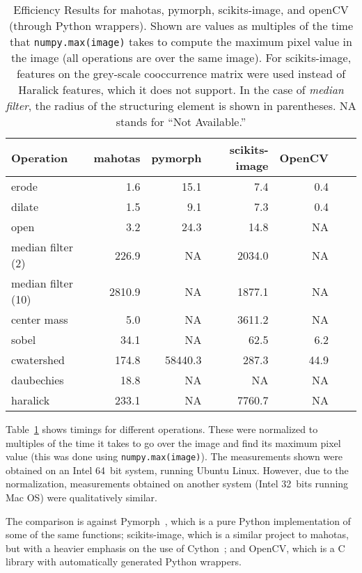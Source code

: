 \documentclass{scrartcl}
\newcommand*{\cpp}{{C\nolinebreak[4]\hspace{-.05em}\raisebox{.4ex}{\tiny\textbf{++}}}}
\let\code\texttt
\begin{document}
\begin{table}
\centering
\begin{tabular}{lrrrrrr}
\toprule
Operation            &  mahotas &  pymorph & scikits-image & OpenCV \\
\midrule
erode                &      1.6 &     15.1 &      7.4 &      0.4  \\
dilate               &      1.5 &      9.1 &      7.3 &      0.4  \\
open                 &      3.2 &     24.3 &     14.8 &       NA  \\
median filter (2)    &    226.9 &       NA &   2034.0 &       NA  \\
median filter (10)   &   2810.9 &       NA &   1877.1 &       NA  \\
center mass          &      5.0 &       NA &   3611.2 &       NA  \\
sobel                &     34.1 &       NA &     62.5 &      6.2  \\
cwatershed           &    174.8 &  58440.3 &    287.3 &     44.9  \\
daubechies           &     18.8 &       NA &       NA &       NA  \\
haralick             &    233.1 &       NA &   7760.7 &       NA  \\
\bottomrule
\end{tabular}
\caption{Efficiency Results for mahotas, pymorph, scikits-image, and openCV
(through Python wrappers). Shown are values as multiples of the time that
\code{numpy.max(image)} takes to compute the maximum pixel value in the image
(all operations are over the same image). For scikits-image, features on the
grey-scale cooccurrence matrix were used instead of Haralick features, which it
does not support. In the case of \emph{median filter}, the radius of the
structuring element is shown in parentheses. NA stands for ``Not Available.''}
\label{tab:efficiency} \end{table}

Table~\ref{tab:efficiency} shows timings for different operations. These were
normalized to multiples of the time it takes to go over the image and find its
maximum pixel value (this was done using \code{numpy.max(image)}). The
measurements shown were obtained on an Intel 64~bit system, running Ubuntu
Linux. However, due to the normalization, measurements obtained on another
system (Intel 32~bits running Mac OS) were qualitatively similar.

The comparison is against Pymorph~\citep{DougLotu:03}, which is a pure Python
implementation of some of the same functions; scikits-image, which is a similar
project to mahotas, but with a heavier emphasis on the use of
Cython~\citep{Cython}; and OpenCV, which is a \cpp{} library with automatically
generated Python wrappers.
\end{document}

